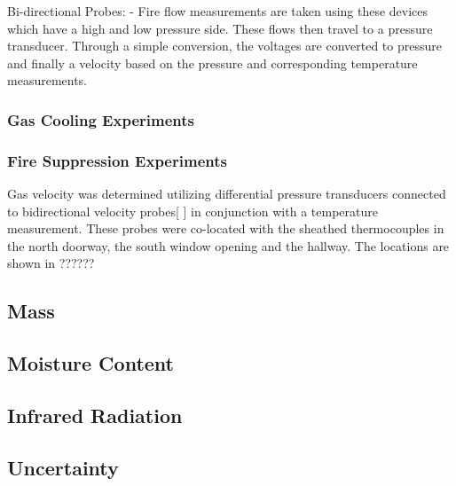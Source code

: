 \documentclass[12pt,oneside]{book}
\begin{document}
Bi-directional Probes:
- Fire flow measurements are taken using these devices which have a high and low pressure side.  These flows then travel to a pressure transducer.  Through a simple conversion, the voltages are converted to pressure and finally a velocity based on the pressure and corresponding temperature measurements.

\subsubsection{Gas Cooling Experiments}
\label{subsubsec:Gas_Cooling_Gas_Velocity_Instrumentation}

\subsubsection{Fire Suppression Experiments}
\label{subsubsec:Fire_Suppression_Gas_Velocity_Instrumentation}

Gas velocity was determined utilizing differential pressure transducers connected to bidirectional velocity probes[ ] in conjunction with a temperature measurement.  These probes were co-located with the sheathed thermocouples in the north doorway, the south window opening and the hallway.  The locations are shown in ??????

\subsection{Mass}
\label{subsec:Mass}

\subsection{Moisture Content}
\label{subsec:Moisture_Content}

\subsection{Infrared Radiation}
\label{subsec:Infrared_Radiation}

\subsection{Uncertainty}
\label{subsec:Uncertainty}
\end{document}
